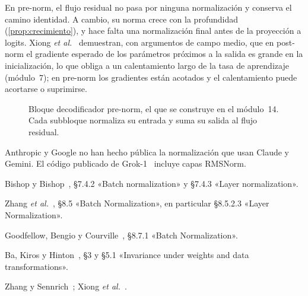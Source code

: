 En pre-norm, el flujo residual no pasa por ninguna normalización y conserva el camino identidad. A cambio, su norma crece con la profundidad (\cref{prop:crecimiento}), y hace falta una normalización final antes de la proyección a logits. Xiong \emph{et al.}~\cite{xiong} demuestran, con argumentos de campo medio, que en post-norm el gradiente esperado de los parámetros próximos a la salida es grande en la inicialización, lo que obliga a un calentamiento largo de la tasa de aprendizaje (módulo~7); en pre-norm los gradientes están acotados y el calentamiento puede acortarse o suprimirse.

\begin{figure}[h]
\centering
{}
\caption{Bloque decodificador pre-norm, el que se construye en el módulo~14. Cada subbloque normaliza su entrada y suma su salida al flujo residual.}
\label{fig:prenorm}
\end{figure}

\begin{observacion}
Anthropic y Google no han hecho pública la normalización que usan Claude y Gemini. El código publicado de Grok-1~\cite{grok1} incluye capas RMSNorm.
\end{observacion}

\begin{lecturas}
\item Bishop y Bishop~\cite{bishopdl}, §7.4.2 «Batch normalization» y §7.4.3 «Layer normalization».
\item Zhang \emph{et al.}~\cite{d2l}, §8.5 «Batch Normalization», en particular §8.5.2.3 «Layer Normalization».
\item Goodfellow, Bengio y Courville~\cite{gbc}, §8.7.1 «Batch Normalization».
\item Ba, Kiros y Hinton~\cite{layernorm}, §3 y §5.1 «Invariance under weights and data transformations».
\item Zhang y Sennrich~\cite{rmsnorm}; Xiong \emph{et al.}~\cite{xiong}.
\end{lecturas}


